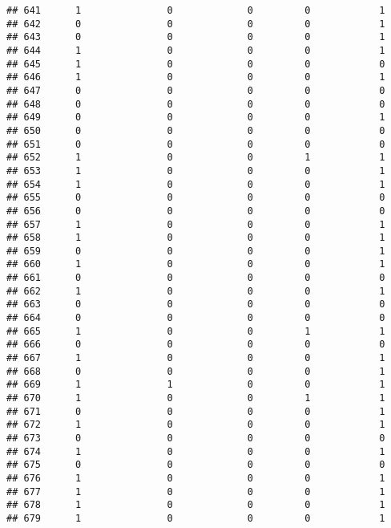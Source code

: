 \documentclass[]{article}
\begin{document}
\begin{verbatim}
## 641      1               0             0         0            1
## 642      0               0             0         0            1
## 643      0               0             0         0            1
## 644      1               0             0         0            1
## 645      1               0             0         0            0
## 646      1               0             0         0            1
## 647      0               0             0         0            0
## 648      0               0             0         0            0
## 649      0               0             0         0            1
## 650      0               0             0         0            0
## 651      0               0             0         0            0
## 652      1               0             0         1            1
## 653      1               0             0         0            1
## 654      1               0             0         0            1
## 655      0               0             0         0            0
## 656      0               0             0         0            0
## 657      1               0             0         0            1
## 658      1               0             0         0            1
## 659      0               0             0         0            1
## 660      1               0             0         0            1
## 661      0               0             0         0            0
## 662      1               0             0         0            1
## 663      0               0             0         0            0
## 664      0               0             0         0            0
## 665      1               0             0         1            1
## 666      0               0             0         0            0
## 667      1               0             0         0            1
## 668      0               0             0         0            1
## 669      1               1             0         0            1
## 670      1               0             0         1            1
## 671      0               0             0         0            1
## 672      1               0             0         0            1
## 673      0               0             0         0            0
## 674      1               0             0         0            1
## 675      0               0             0         0            0
## 676      1               0             0         0            1
## 677      1               0             0         0            1
## 678      1               0             0         0            1
## 679      1               0             0         0            1

\end{verbatim}
\end{document}
